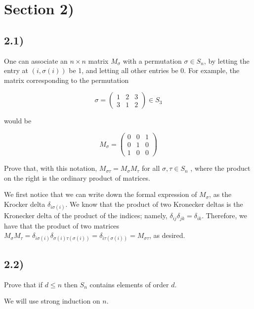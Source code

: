 \section*{Section 2)}

\subsection*{2.1)}

One can associate an $n \times n$ matrix $M_\sigma$ with a permutation $\sigma \in S_n$, by letting the entry at $(i, \sigma(i))$ be 1, and letting all other entries be 0. For example, the matrix corresponding to the permutation

\begin{equation}
\sigma =
	\begin{pmatrix}
		1 & 2 & 3 \\
		3 & 1 & 2
	\end{pmatrix}
\in S_3
\end{equation}

would be

\begin{equation}
M_\sigma =
	\begin{pmatrix}
		0 & 0 & 1 \\
		0 & 1 & 0 \\
		1 & 0 & 0
	\end{pmatrix}
\end{equation}

Prove that, with this notation, $M_{\sigma\tau} = M_\sigma M_\tau$ for all $\sigma, \tau \in S_n$ , where the product on the right is the ordinary product of matrices.

We first notice that we can write down the formal expression of $M_\sigma$, as the Krocker delta $\delta_{i \sigma(i)}$. We know that the product of two Kronecker deltas is the Kronecker delta of the product of the indices; namely, $\delta_{ij} \delta_{jk} = \delta_{ik}$. Therefore, we have that the product of two matrices $M_\sigma M_\tau = \delta_{i \sigma(i)} \delta_{\sigma(i) \tau(\sigma(i))} = \delta_{i \tau(\sigma(i))} = M_{\sigma\tau}$, as desired.


\subsection*{2.2)}

Prove that if $d \leq n$ then $S_n$ contains elements of order $d$.

We will use strong induction on $n$.


